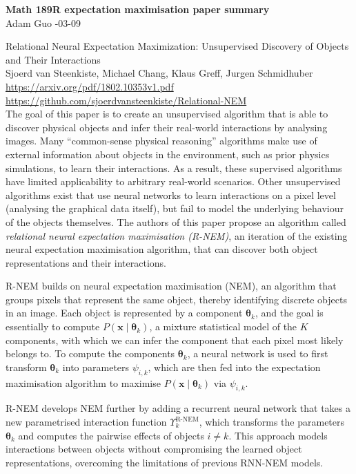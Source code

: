 \documentclass[letter,11pt]{article}
\newcommand{\xx}{\bm{x}}
\newcommand{\thetab}{\bm{\theta}}
\begin{document}
\begin{center}
    {\bf \Large Math 189R expectation maximisation paper summary} \\
    \vspace{0.1in}
    Adam Guo -03-09
\end{center}

\noindent Relational Neural Expectation Maximization: Unsupervised Discovery of Objects and Their Interactions \\
Sjoerd van Steenkiste, Michael Chang, Klaus Greff, Jurgen Schmidhuber \\
\url{https://arxiv.org/pdf/1802.10353v1.pdf} \\
\url{https://github.com/sjoerdvansteenkiste/Relational-NEM} \\

The goal of this paper is to create an unsupervised algorithm that is able to discover physical objects and infer their real-world interactions by analysing images. Many ``common-sense physical reasoning'' algorithms make use of external information about objects in the environment, such as prior physics simulations, to learn their interactions. As a result, these supervised algorithms have limited applicability to arbitrary real-world scenarios. Other unsupervised algorithms exist that use neural networks to learn interactions on a pixel level (analysing the graphical data itself), but fail to model the underlying behaviour of the objects themselves. The authors of this paper propose an algorithm called \textit{relational neural expectation maximisation (R-NEM)}, an iteration of the existing neural expectation maximisation algorithm, that can discover both object representations and their interactions.

R-NEM builds on neural expectation maximisation (NEM), an algorithm that groups pixels that represent the same object, thereby identifying discrete objects in an image. Each object is represented by a component $\thetab_k$, and the goal is essentially to compute $P(\xx \mid \thetab_k)$, a mixture statistical model of the $K$ components, with which we can infer the component that each pixel most likely belongs to. To compute the components $\thetab_k$, a neural network is used to first transform $\thetab_k$ into parameters $\psi_{i, k}$, which are then fed into the expectation maximisation algorithm to maximise $P(\xx \mid \thetab_k)$ via $\psi_{i, k}$.

R-NEM develops NEM further by adding a recurrent neural network that takes a new parametrised interaction function $\Upsilon_k^{\text{R-NEM}}$, which transforms the parameters $\thetab_k$ and computes the pairwise effects of objects $i \neq k$. This approach models interactions between objects without compromising the learned object representations, overcoming the limitations of previous RNN-NEM models.
\end{document}
